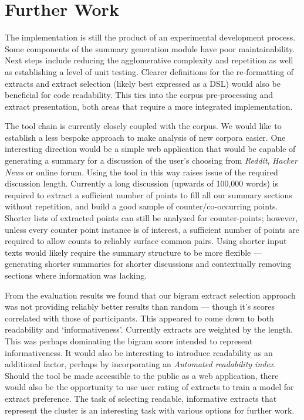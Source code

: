   \section{Further Work}
    The implementation is still the product of an experimental development process. Some components of the summary generation module have poor maintainability. Next steps include reducing the agglomerative complexity and repetition as well as establishing a level of unit testing. Clearer definitions for the re-formatting of extracts and extract selection (likely best expressed as a DSL) would also be beneficial for code readability. This ties into the corpus pre-processing and extract presentation, both areas that require a more integrated implementation.

    The tool chain is currently closely coupled with the corpus. We would like to establish a less bespoke approach to make analysis of new corpora easier. One interesting direction would be a simple web application that would be capable of generating a summary for a discussion of the user's choosing from \textit{Reddit}, \textit{Hacker News} or online forum. Using the tool in this way raises issue of the required discussion length. Currently a long discussion (upwards of 100,000 words) is required to extract a sufficient number of points to fill all our summary sections without repetition, and build a good sample of counter/co-occurring points. Shorter lists of extracted points can still be analyzed for counter-points; however, unless every counter point instance is of interest, a sufficient number of points are required to allow counts to reliably surface common pairs. Using shorter input texts would likely require the summary structure to be more flexible --- generating shorter summaries for shorter discussions and contextually removing sections where information was lacking.

    From the evaluation results we found that our bigram extract selection approach was not providing reliably better results than random --- though it's scores correlated with those of participants. This appeared to come down to both readability and `informativeness'. Currently extracts are weighted by the length. This was perhaps dominating the bigram score intended to represent informativeness. It would also be interesting to introduce readability as an additional factor, perhaps by incorporating an \textit{Automated readability index}. Should the tool be made accessible to the public as a web application, there would also be the opportunity to use user rating of extracts to train a model for extract preference. The task of selecting readable, informative extracts that represent the cluster is an interesting task with various options for further work.

